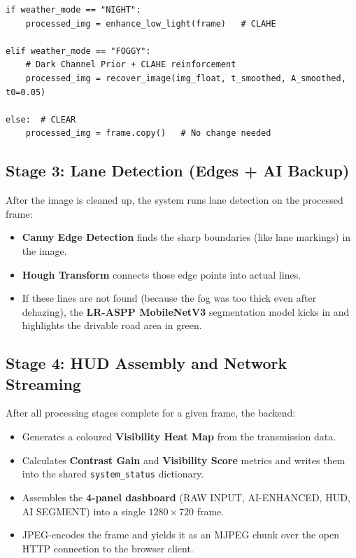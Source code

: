 \documentclass[12pt, a4paper]{article}
\begin{document}
\begin{tcolorbox}[
  colback=green!5!white,
  colframe=green!50!black,
  title={\textbf{Routing Logic (from backend/api.py)}},
  arc=4pt
]
\begin{lstlisting}
if weather_mode == "NIGHT":
    processed_img = enhance_low_light(frame)   # CLAHE

elif weather_mode == "FOGGY":
    # Dark Channel Prior + CLAHE reinforcement
    processed_img = recover_image(img_float, t_smoothed, A_smoothed, t0=0.05)

else:  # CLEAR
    processed_img = frame.copy()   # No change needed
\end{lstlisting}
\end{tcolorbox}

\subsection{Stage 3: Lane Detection (Edges + AI Backup)}

After the image is cleaned up, the system runs lane detection on the
processed frame:

\begin{itemize}
  \item \textbf{Canny Edge Detection} finds the sharp boundaries (like lane
  markings) in the image.
  \item \textbf{Hough Transform} connects those edge points into actual lines.
  \item If these lines are not found (because the fog was too thick even after
  dehazing), the \textbf{LR-ASPP MobileNetV3} segmentation model kicks in
  and highlights the drivable road area in green.
\end{itemize}

\subsection{Stage 4: HUD Assembly and Network Streaming}

After all processing stages complete for a given frame, the backend:
\begin{itemize}
  \item Generates a coloured \textbf{Visibility Heat Map} from the transmission
  data.
  \item Calculates \textbf{Contrast Gain} and \textbf{Visibility Score} metrics
  and writes them into the shared \texttt{system\_status} dictionary.
  \item Assembles the \textbf{4-panel dashboard} (RAW INPUT, AI-ENHANCED,
  HUD, AI SEGMENT) into a single $1280 \times 720$ frame.
  \item JPEG-encodes the frame and yields it as an MJPEG chunk over the open
  HTTP connection to the browser client.
\end{itemize}
\end{document}

